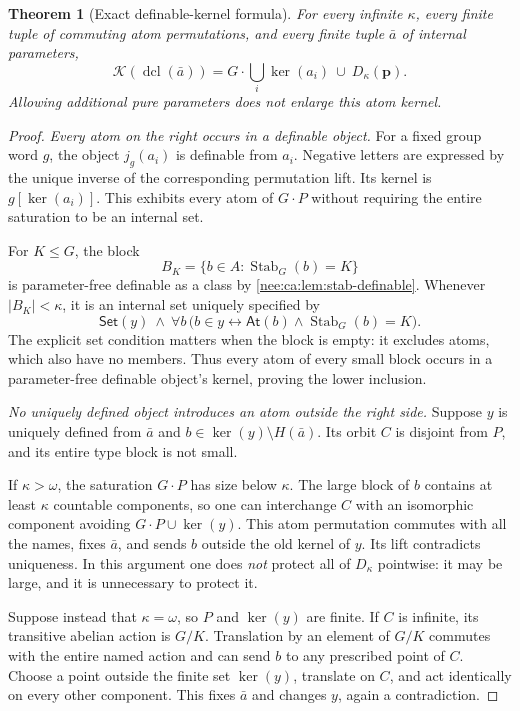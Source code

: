 \documentclass[11pt,letterpaper]{article}
\numberwithin{equation}{section}
\theoremstyle{plain}
\newtheorem{theorem}{Theorem}[section]
\theoremstyle{definition}
\theoremstyle{remark}
\newcommand{\At}{\mathsf{At}}
\newcommand{\Set}{\mathsf{Set}}
\newcommand{\kerat}{\operatorname{ker}}
\newcommand{\dcl}{\operatorname{dcl}}
\newcommand{\Stab}{\operatorname{Stab}}
\begin{document}
\begin{theorem}[Exact definable-kernel formula]\label{nee:ca:thm:dcl}
For every infinite $\kappa$, every finite tuple of commuting atom permutations, and every finite tuple $\bar a$ of internal parameters,
\begin{equation}\label{nee:ca:eq:dcl-exact}
\mathcal K(\dcl(\bar a))
=G\cdot\bigcup_i\kerat(a_i)\ \cup\ D_\kappa(\boldsymbol p).
\end{equation}
Allowing additional pure parameters does not enlarge this atom kernel.
\end{theorem}
\begin{proof}
\emph{Every atom on the right occurs in a definable object.}
For a fixed group word $g$, the object $j_g(a_i)$ is definable from $a_i$. Negative letters are expressed by the unique inverse of the corresponding permutation lift. Its kernel is $g[\kerat(a_i)]$. This exhibits every atom of $G\cdot P$ without requiring the entire saturation to be an internal set.

For $K\leq G$, the block
\[
B_K=\{b\in A:\Stab_G(b)=K\}
\]
is parameter-free definable as a class by \cref{nee:ca:lem:stab-definable}. Whenever $|B_K|<\kappa$, it is an internal set uniquely specified by
\[
\Set(y)\ \land\ \forall b\,
\bigl(b\in y\longleftrightarrow\At(b)\land\Stab_G(b)=K\bigr).
\]
The explicit set condition matters when the block is empty: it excludes atoms, which also have no members. Thus every atom of every small block occurs in a parameter-free definable object's kernel, proving the lower inclusion.

\emph{No uniquely defined object introduces an atom outside the right side.}
Suppose $y$ is uniquely defined from $\bar a$ and
$b\in\kerat(y)\setminus H(\bar a)$. Its orbit $C$ is disjoint from $P$, and its entire type block is not small.

If $\kappa>\omega$, the saturation $G\cdot P$ has size below $\kappa$. The large block of $b$ contains at least $\kappa$ countable components, so one can interchange $C$ with an isomorphic component avoiding $G\cdot P\cup\kerat(y)$. This atom permutation commutes with all the names, fixes $\bar a$, and sends $b$ outside the old kernel of $y$. Its lift contradicts uniqueness. In this argument one does \emph{not} protect all of $D_\kappa$ pointwise: it may be large, and it is unnecessary to protect it.

Suppose instead that $\kappa=\omega$, so $P$ and $\kerat(y)$ are finite. If $C$ is infinite, its transitive abelian action is $G/K$. Translation by an element of $G/K$ commutes with the entire named action and can send $b$ to any prescribed point of $C$. Choose a point outside the finite set $\kerat(y)$, translate on $C$, and act identically on every other component. This fixes $\bar a$ and changes $y$, again a contradiction.


\end{proof}
\end{document}
